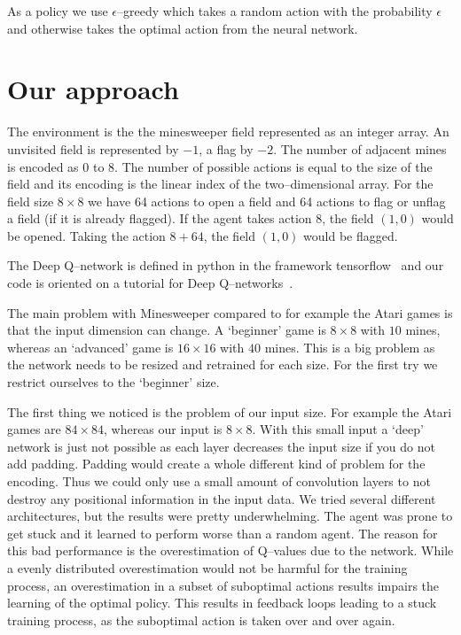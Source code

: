 As a policy we use $\epsilon$--greedy which takes a random action with the probability $\epsilon$ and otherwise takes the optimal action from the neural network.

\section{Our approach}
The environment is the the minesweeper field represented as an integer array.
An unvisited field is represented by $-1$, a flag by $-2$.
The number of adjacent mines is encoded as $0$ to $8$.
The number of possible actions is equal to the size of the field and its encoding is the linear index of the two--dimensional array.
For the field size $8 \times 8$ we have 64 actions to open a field and 64 actions to flag or unflag a field (if it is already flagged).
If the agent takes action $8$, the field $(1, 0)$ would be opened.
Taking the action $8+64$, the field $(1, 0)$ would be flagged.

The Deep Q--network is defined in python in the framework tensorflow~\cite{tensorflow2015-whitepaper} and our code is oriented on a tutorial for Deep Q--networks~\cite{SimpleReLe}.

The main problem with Minesweeper compared to for example the Atari games is that the input dimension can change.
A `beginner' game is $8 \times 8$ with $10$ mines, whereas an `advanced' game is $16 \times 16$ with $40$ mines.
This is a big problem as the network needs to be resized and retrained for each size.
For the first try we restrict ourselves to the `beginner' size.

The first thing we noticed is the problem of our input size.
For example the Atari games are $84 \times 84$, whereas our input is $8 \times 8$.
With this small input a `deep' network is just not possible as each layer decreases the input size if you do not add padding.
Padding would create a whole different kind of problem for the encoding.
Thus we could only use a small amount of convolution layers to not destroy any positional information in the input data.
We tried several different architectures, but the results were pretty underwhelming.
The agent was prone to get stuck and it learned to perform worse than a random agent.
The reason for this bad performance is the overestimation of Q--values due to the network.
While a evenly distributed overestimation would not be harmful for the training process, an overestimation in a subset of suboptimal actions results impairs the learning of the optimal policy.
This results in feedback loops leading to a stuck training process, as the suboptimal action is taken over and over again.

